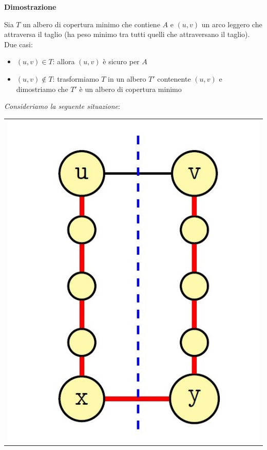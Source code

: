 \documentclass[../cheatSheetAlgoritmi.tex]{subfiles}
\begin{document}
\bigskip

\textbf{Dimostrazione}

Sia $T$ un albero di copertura minimo che contiene $A$ e $(u, v)$ un arco leggero che attraversa il taglio (ha peso minimo tra tutti quelli che attraversano il taglio). Due casi:
\begin{itemize}
	\item $(u, v) \in T$: allora $(u, v)$ è sicuro per $A$
	\item $(u, v) \notin T$: trasformiamo $T$ in un albero $T'$ contenente $(u, v)$ e dimostriamo che $T'$ è un albero di copertura minimo
\end{itemize}
\newpage
\begin{flushleft}
\emph{Consideriamo la seguente situazione}:
\end{flushleft}
\begin{table}[t] 
\begin{tabular}{@{}c@{}} %
\begin{minipage}{0.3\textwidth}
\includegraphics[width=\linewidth]{../img/Greedy_5.jpg}

\end{minipage}
\end{tabular}
\end{table}
\end{document}
